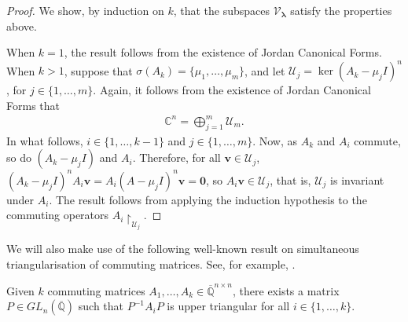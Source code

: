 \begin{proof}
We show, by induction on $k$, that the subspaces $\mathcal{V}_{\boldsymbol{\lambda}}$ satisfy the properties above.

When $k = 1$, the result follows from the existence of Jordan Canonical Forms. When $k > 1$, suppose that $\sigma(A_{k}) = \lbrace \mu_{1}, \ldots, \mu_{m} \rbrace$, and let $\mathcal{U}_{j} = \ker(A_{k} - \mu_{j} I)^{n}$, for $j \in \lbrace 1, \ldots, m \rbrace$. Again, it follows from the existence of Jordan Canonical Forms that
\begin{align*}
\mathbb{C}^{n} = \bigoplus \limits_{j = 1}^{m} \mathcal{U}_{m} .
\end{align*}
In what follows, $i \in \lbrace 1, \ldots, k-1 \rbrace$ and $j \in \lbrace 1, \ldots, m \rbrace$. Now, as $A_{k}$ and $A_{i}$ commute, so do $(A_{k}-\mu_{j} I)$ and $A_{i}$. Therefore, for all $\boldsymbol{v} \in \mathcal{U}_{j}$, $(A_{k} - \mu_{j} I)^{n} A_{i} \boldsymbol{v} = A_{i} (A-\mu_{j} I)^{n} \boldsymbol{v} = \boldsymbol{0}$, so $A_{i} \boldsymbol{v} \in \mathcal{U}_{j}$, that is, $\mathcal{U}_{j}$ is invariant under $A_{i}$. The result follows from applying the induction hypothesis to the commuting operators $A_{i} \restriction_{\mathcal{U}_{j}}$.
\end{proof}

We will also make use of the following well-known result on simultaneous triangularisation of commuting matrices. See, for example, \cite{CommutingMatrices}.

\begin{theorem}
\label{simultaneous-triangularisation}
Given $k$ commuting matrices $A_{1}, \ldots, A_{k} \in \overline{\mathbb{Q}}^{n \times n}$, there exists a matrix $P \in \mathit{GL}_{n}(\overline{\mathbb{Q}})$ such that $P^{-1}A_{i}P$ is upper triangular for all $i \in \lbrace 1, \ldots, k \rbrace$.
\end{theorem}
